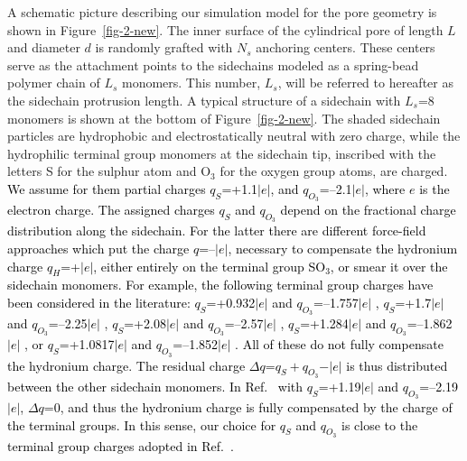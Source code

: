 \documentclass[3p,english,preprint]{elsarticle}
\newcommand{\need}[1]{\textcolor{black}{#1}}
\newcommand{\mage}[1]{\textcolor{black}{#1}}
\begin{document}
A schematic picture describing  our simulation  model for the pore geometry  
 is shown in Figure~\ref{fig-2-new}.
The inner surface of the cylindrical pore of length $L$ and diameter $d$
is randomly grafted with  $N_s$  anchoring centers. 
These centers serve as the attachment points to the sidechains  
 modeled as a spring-bead polymer chain of $L_s$ monomers. 
This number, $L_s$, 
will be referred to hereafter as the sidechain protrusion length.
 A typical structure of a sidechain with $L_s$=8 monomers is
  shown at the bottom of Figure~\ref{fig-2-new}. The shaded sidechain
 particles are hydrophobic and  electrostatically neutral with 
zero charge, %
    while the hydrophilic terminal group monomers at the sidechain 
tip,  inscribed with the letters S for the sulphur atom %
and  O$_3$ for the oxygen group atoms,  %
are charged. 
{\need{
We assume for them partial charges $q_S$=+1.1$\vert e \vert$, and 
 $q_{O_3}$=--2.1$\vert e \vert$, 
\cite{allahyarov-2011-poling-of-dry,allahyarov-swelling-2009}  
where $e$ is the electron charge. 
The assigned charges $q_S$ and $q_{O_3}$ depend on the fractional charge distribution along the sidechain. 
For the latter there are different force-field approaches 
\cite{spohr-2004,jang2004,jinnouchi-2003,li-2001-partial-charges,urata-2005,vishnyakov2001} which   
  put the charge $q$=--$\vert e \vert$, necessary to compensate the hydronium charge $q_H$=+$\vert e \vert$,
 either entirely on the  terminal group SO$_3$, or smear it over the sidechain 
monomers. For example,  the following terminal group charges have been considered in the literature: 
 $q_S$=+0.932$\vert e \vert$ and $q_{O_3}$=--1.757$\vert e \vert$ \cite{urata-2005},
 $q_S$=+1.7$\vert e \vert$ and $q_{O_3}$=--2.25$\vert e \vert$ \cite{vishnyakov2001},
 $q_S$=+2.08$\vert e \vert$ and $q_{O_3}$=--2.57$\vert e \vert$ \cite{li-2001-partial-charges},
 $q_S$=+1.284$\vert e \vert$ and $q_{O_3}$=--1.862$\vert e \vert$ \cite{jinnouchi-2003}, 
or $q_S$=+1.0817$\vert e \vert$ and $q_{O_3}$=--1.852$\vert e \vert$ \cite{jang2004}. 
All of these do not fully compensate the  hydronium charge.  
The residual charge $\Delta q$=$q_S + q_{O_3} -\vert e \vert$ 
 is thus distributed between the other sidechain monomers. 
In Ref.~\cite{spohr-2004} with  $q_S$=+1.19$\vert e \vert$ and $q_{O_3}$=--2.19$\vert e \vert$,  
$\Delta q$=0, and thus  the hydronium charge is fully compensated by the charge of the terminal groups. 
In this sense, our choice for  $q_S$  and $q_{O_3}$ is close to the terminal group charges   adopted in Ref.~\cite{spohr-2004}. 
}}
\end{document}
